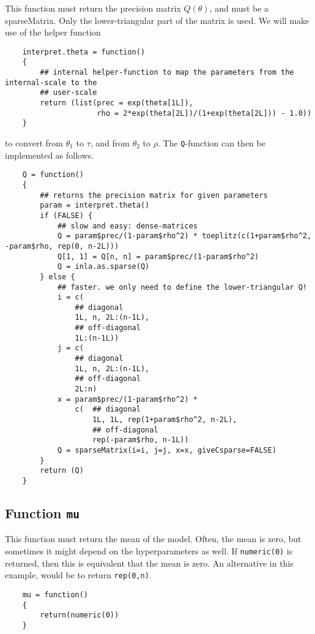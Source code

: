 \documentclass[a4paper,11pt]{article}
\begin{document}
This function must return the precision matrix $Q(\theta)$, and 
must be a sparseMatrix. Only the
lower-triangular part of the matrix is used. We will make use of the
helper function
{\small
\begin{verbatim}
    interpret.theta = function()
    {
        ## internal helper-function to map the parameters from the internal-scale to the
        ## user-scale
        return (list(prec = exp(theta[1L]),
                     rho = 2*exp(theta[2L])/(1+exp(theta[2L])) - 1.0))
    }
\end{verbatim}
}
to convert from $\theta_{1}$ to $\tau$, and from $\theta_{2}$ to
$\rho$.  The \texttt{Q}-function can then be implemented as follows.
{\small
\begin{verbatim}
    Q = function()
    {
        ## returns the precision matrix for given parameters
        param = interpret.theta()
        if (FALSE) {
            ## slow and easy: dense-matrices
            Q = param$prec/(1-param$rho^2) * toeplitz(c(1+param$rho^2, -param$rho, rep(0, n-2L)))
            Q[1, 1] = Q[n, n] = param$prec/(1-param$rho^2)
            Q = inla.as.sparse(Q)
        } else {
            ## faster. we only need to define the lower-triangular Q!
            i = c(
                ## diagonal
                1L, n, 2L:(n-1L),
                ## off-diagonal
                1L:(n-1L))
            j = c(
                ## diagonal
                1L, n, 2L:(n-1L),
                ## off-diagonal
                2L:n)
            x = param$prec/(1-param$rho^2) *
                c(  ## diagonal
                    1L, 1L, rep(1+param$rho^2, n-2L),
                    ## off-diagonal
                    rep(-param$rho, n-1L))
            Q = sparseMatrix(i=i, j=j, x=x, giveCsparse=FALSE)
        }            
        return (Q)
    }
\end{verbatim}
}

\subsection*{Function \texttt{mu}}

This function must return the mean of the model. Often, the mean is
zero, but sometimes it might depend on the hyperparameters as well. If
\texttt{numeric(0)} is returned, then this is equivalent that the mean
is zero. An alternative in this example, would be to return
\texttt{rep(0,n)}.

{\small
\begin{verbatim}
    mu = function()
    {
        return(numeric(0))
    }
\end{verbatim}
}
\end{document}
